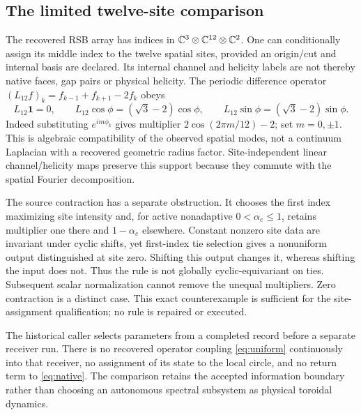 \subsection{The limited twelve-site comparison}
The recovered RSB array has indices in $\mathbb C^3\otimes\mathbb C^{12}\otimes\mathbb C^2$. One can conditionally assign its middle index to the twelve spatial sites, provided an origin/cut and internal basis are declared. Its internal channel and helicity labels are not thereby native faces, gap pairs or physical helicity. The periodic difference operator $(L_{12}f)_k=f_{k-1}+f_{k+1}-2f_k$ obeys
\begin{equation}\label{eq:laplacian}
L_{12}\mathbf1=0,\qquad
L_{12}\cos\phi=(\sqrt3-2)\cos\phi,\qquad
L_{12}\sin\phi=(\sqrt3-2)\sin\phi.
\end{equation}
Indeed substituting $e^{im\phi_k}$ gives multiplier $2\cos(2\pi m/12)-2$; set $m=0,\pm1$. This is algebraic compatibility of the observed spatial modes, not a continuum Laplacian with a recovered geometric radius factor. Site-independent linear channel/helicity maps preserve this support because they commute with the spatial Fourier decomposition.

The source contraction has a separate obstruction. It chooses the first index maximizing site intensity and, for active nonadaptive $0<\alpha_e\le1$, retains multiplier one there and $1-\alpha_e$ elsewhere. Constant nonzero site data are invariant under cyclic shifts, yet first-index tie selection gives a nonuniform output distinguished at site zero. Shifting this output changes it, whereas shifting the input does not. Thus the rule is not globally cyclic-equivariant on ties. Subsequent scalar normalization cannot remove the unequal multipliers. Zero contraction is a distinct case. This exact counterexample is sufficient for the site-assignment qualification; no rule is repaired or executed.~\cite{RSB,SRG03}

The historical caller selects parameters from a completed record before a separate receiver run. There is no recovered operator coupling \eqref{eq:uniform} continuously into that receiver, no assignment of its state to the local circle, and no return term to \eqref{eq:native}. The comparison retains the accepted information boundary rather than choosing an autonomous spectral subsystem as physical toroidal dynamics.

